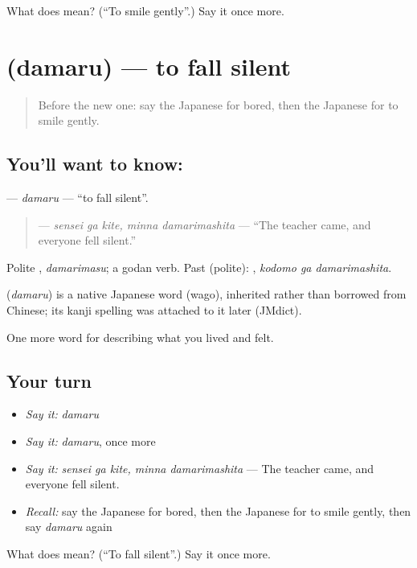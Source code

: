 \begin{tcolorbox}[breakable,colback=teal!4,colframe=teal!35!black,title={Before you move on}]
What does  mean? (\textquotedblleft{}To smile gently\textquotedblright{}.) Say it once more.
\end{tcolorbox}
\section[\texorpdfstring{\ja{だまる} (damaru)}{だまる (damaru)}]{ (damaru) — to fall silent}

\label{lesson:JA-C435-damaru}



\begin{quote}
Before the new one: say the Japanese for bored, then the Japanese for to smile gently.
\end{quote}

\subsection*{You'll want to know: }
\textbf{} — \emph{damaru} — \textquotedblleft{}to fall silent\textquotedblright{}.

\begin{quote}
\textbf{  } — \emph{sensei ga kite, minna damarimashita} — \textquotedblleft{}The teacher came, and everyone fell silent.\textquotedblright{}
\end{quote}

Polite \textbf{}, \emph{damarimasu}; a godan verb. Past (polite): \textbf{ }, \emph{kodomo ga damarimashita}.

\begin{cousinweb}
\textbf{} (\emph{damaru}) is a native Japanese word (wago), inherited rather than borrowed from Chinese; its kanji spelling was attached to it later (JMdict).
\end{cousinweb}

\begin{grammarlens}[title={What you've built}]
One more word for describing what you lived and felt.
\end{grammarlens}

\subsection*{Your turn}
\begin{itemize}
\raggedright
  \item \emph{Say it:} \emph{damaru}
  \item \emph{Say it:} \emph{damaru}, once more
  \item \emph{Say it:} \emph{sensei ga kite, minna damarimashita} — The teacher came, and everyone fell silent.
  \item \emph{Recall:} say the Japanese for bored, then the Japanese for to smile gently, then say \emph{damaru} again
\end{itemize}

\begin{tcolorbox}[breakable,colback=teal!4,colframe=teal!35!black,title={Before you move on}]
What does  mean? (\textquotedblleft{}To fall silent\textquotedblright{}.) Say it once more.
\end{tcolorbox}
